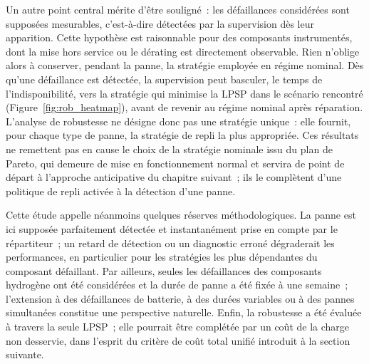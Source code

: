 Un autre point central mérite d'être souligné~: les défaillances considérées sont supposées mesurables, c'est-à-dire détectées par la supervision dès leur apparition. Cette hypothèse est raisonnable pour des composants instrumentés, dont la mise hors service ou le dérating est directement observable. Rien n'oblige alors à conserver, pendant la panne, la stratégie employée en régime nominal. Dès qu'une défaillance est détectée, la supervision peut basculer, le temps de l'indisponibilité, vers la stratégie qui minimise la LPSP dans le scénario rencontré (Figure~\ref{fig:rob_heatmap}), avant de revenir au régime nominal après réparation. L'analyse de robustesse ne désigne donc pas une stratégie unique~: elle fournit, pour chaque type de panne, la stratégie de repli la plus appropriée. Ces résultats ne remettent pas en cause le choix de la stratégie nominale issu du plan de Pareto, qui demeure de mise en fonctionnement normal et servira de point de départ à l'approche anticipative du chapitre suivant~; ils le complètent d'une politique de repli activée à la détection d'une panne.

Cette étude appelle néanmoins quelques réserves méthodologiques. La panne est ici supposée parfaitement détectée et instantanément prise en compte par le répartiteur~; un retard de détection ou un diagnostic erroné dégraderait les performances, en particulier pour les stratégies les plus dépendantes du composant défaillant. Par ailleurs, seules les défaillances des composants hydrogène ont été considérées et la durée de panne a été fixée à une semaine~; l'extension à des défaillances de batterie, à des durées variables ou à des pannes simultanées constitue une perspective naturelle. Enfin, la robustesse a été évaluée à travers la seule LPSP~; elle pourrait être complétée par un coût de la charge non desservie, dans l'esprit du critère de coût total unifié introduit à la section suivante.
